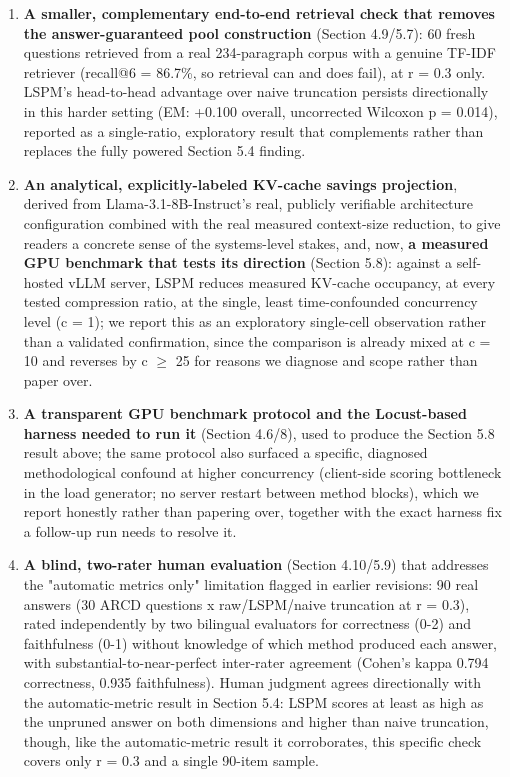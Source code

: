 \begin{enumerate}
\item \textbf{A smaller, complementary end-to-end retrieval check that removes the answer-guaranteed pool construction} (Section 4.9/5.7): 60 fresh questions retrieved from a real 234-paragraph corpus with a genuine TF-IDF retriever (recall@6 = 86.7\%, so retrieval can and does fail), at r = 0.3 only. LSPM's head-to-head advantage over naive truncation persists directionally in this harder setting (EM: +0.100 overall, uncorrected Wilcoxon p = 0.014), reported as a single-ratio, exploratory result that complements rather than replaces the fully powered Section 5.4 finding.
\item \textbf{An analytical, explicitly-labeled KV-cache savings projection}, derived from Llama-3.1-8B-Instruct's real, publicly verifiable architecture configuration combined with the real measured context-size reduction, to give readers a concrete sense of the systems-level stakes, and, now, \textbf{a measured GPU benchmark that tests its direction} (Section 5.8): against a self-hosted vLLM server, LSPM reduces measured KV-cache occupancy, at every tested compression ratio, at the single, least time-confounded concurrency level (c = 1); we report this as an exploratory single-cell observation rather than a validated confirmation, since the comparison is already mixed at c = 10 and reverses by c $\geq$ 25 for reasons we diagnose and scope rather than paper over.
\item \textbf{A transparent GPU benchmark protocol and the Locust-based harness needed to run it} (Section 4.6/8), used to produce the Section 5.8 result above; the same protocol also surfaced a specific, diagnosed methodological confound at higher concurrency (client-side scoring bottleneck in the load generator; no server restart between method blocks), which we report honestly rather than papering over, together with the exact harness fix a follow-up run needs to resolve it.
\item \textbf{A blind, two-rater human evaluation} (Section 4.10/5.9) that addresses the "automatic metrics only" limitation flagged in earlier revisions: 90 real answers (30 ARCD questions x raw/LSPM/naive truncation at r = 0.3), rated independently by two bilingual evaluators for correctness (0-2) and faithfulness (0-1) without knowledge of which method produced each answer, with substantial-to-near-perfect inter-rater agreement (Cohen's kappa 0.794 correctness, 0.935 faithfulness). Human judgment agrees directionally with the automatic-metric result in Section 5.4: LSPM scores at least as high as the unpruned answer on both dimensions and higher than naive truncation, though, like the automatic-metric result it corroborates, this specific check covers only r = 0.3 and a single 90-item sample.
\end{enumerate}
